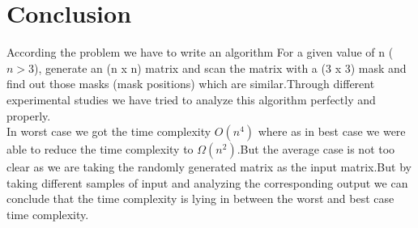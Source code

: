 \documentclass[conference]{IEEEtran}
\begin{document}
\section{\textbf{Conclusion}}
According the problem we have to write an algorithm For a given value of n ($n > 3 $), generate an (n x n) matrix and scan the matrix with a (3 x 3) mask and find out those masks (mask positions) which are similar.Through different experimental studies we have tried to analyze this algorithm perfectly and properly.\\

In worst case we got the time complexity $O(n^4)$ where as in best case we were able to reduce the time complexity to $\Omega(n^2)$.But the average case is not too clear as we are taking the randomly generated matrix as the input matrix.But by taking different samples of input and analyzing the corresponding output we can conclude that the time complexity is lying in between the worst and best case time complexity.
\end{document}

